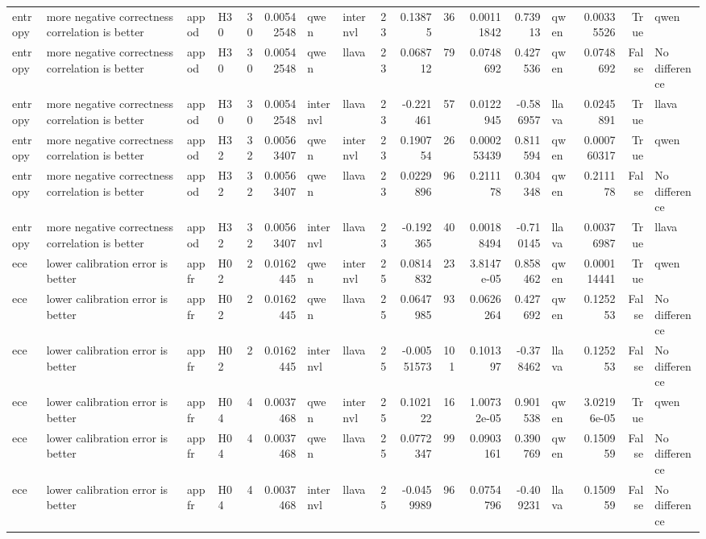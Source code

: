 \begin{longtable}{llllrrllrrrrrlrrl}
entropy & more negative correctness correlation is better & appod & H30 & 30 & 0.00542548 & qwen & internvl & 23 & 0.13875 & 36 & 0.00111842 & 0.73913 & qwen & 0.00335526 & True & qwen \\
entropy & more negative correctness correlation is better & appod & H30 & 30 & 0.00542548 & qwen & llava & 23 & 0.068712 & 79 & 0.0748692 & 0.427536 & qwen & 0.0748692 & False & No difference \\
entropy & more negative correctness correlation is better & appod & H30 & 30 & 0.00542548 & internvl & llava & 23 & -0.221461 & 57 & 0.0122945 & -0.586957 & llava & 0.0245891 & True & llava \\
entropy & more negative correctness correlation is better & appod & H32 & 32 & 0.00563407 & qwen & internvl & 23 & 0.190754 & 26 & 0.000253439 & 0.811594 & qwen & 0.000760317 & True & qwen \\
entropy & more negative correctness correlation is better & appod & H32 & 32 & 0.00563407 & qwen & llava & 23 & 0.0229896 & 96 & 0.211178 & 0.304348 & qwen & 0.211178 & False & No difference \\
entropy & more negative correctness correlation is better & appod & H32 & 32 & 0.00563407 & internvl & llava & 23 & -0.192365 & 40 & 0.00188494 & -0.710145 & llava & 0.00376987 & True & llava \\
ece & lower calibration error is better & appfr & H02 & 2 & 0.0162445 & qwen & internvl & 25 & 0.0814832 & 23 & 3.8147e-05 & 0.858462 & qwen & 0.000114441 & True & qwen \\
ece & lower calibration error is better & appfr & H02 & 2 & 0.0162445 & qwen & llava & 25 & 0.0647985 & 93 & 0.0626264 & 0.427692 & qwen & 0.125253 & False & No difference \\
ece & lower calibration error is better & appfr & H02 & 2 & 0.0162445 & internvl & llava & 25 & -0.00551573 & 101 & 0.101397 & -0.378462 & llava & 0.125253 & False & No difference \\
ece & lower calibration error is better & appfr & H04 & 4 & 0.0037468 & qwen & internvl & 25 & 0.102122 & 16 & 1.00732e-05 & 0.901538 & qwen & 3.02196e-05 & True & qwen \\
ece & lower calibration error is better & appfr & H04 & 4 & 0.0037468 & qwen & llava & 25 & 0.0772347 & 99 & 0.0903161 & 0.390769 & qwen & 0.150959 & False & No difference \\
ece & lower calibration error is better & appfr & H04 & 4 & 0.0037468 & internvl & llava & 25 & -0.0459989 & 96 & 0.0754796 & -0.409231 & llava & 0.150959 & False & No difference \\

\end{longtable}
